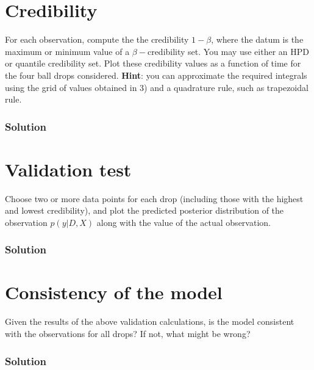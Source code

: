 \documentclass{article}
\begin{document}
\section{Credibility}

For each observation, compute the the credibility $1-\beta$, where
the datum is the maximum or minimum value of a $\beta-$credibility
set. You may use either an HPD or quantile credibility set. Plot these
credibility values as a function of time for the four ball drops considered.
\textbf{Hint}: you can approximate the required integrals using the
grid of values obtained in 3) and a quadrature rule, such as trapezoidal
rule.


\subsubsection*{Solution}


\section{Validation test}

Choose two or more data points for each drop (including those with
the highest and lowest credibility), and plot the predicted posterior
distribution of the observation $p\left(y|D,X\right)$ along with
the value of the actual observation.


\subsubsection*{Solution}


\section{Consistency of the model}

Given the results of the above validation calculations, is the model
consistent with the observations for all drops? If not, what might
be wrong?


\subsubsection*{Solution}
\end{document}
